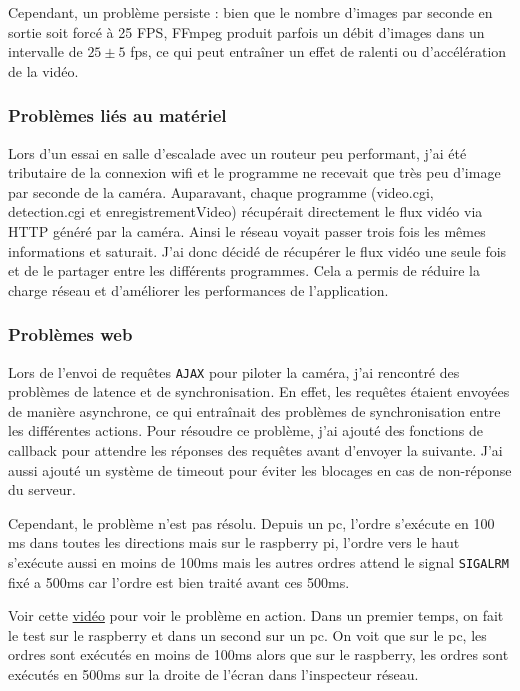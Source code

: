 \documentclass[a4paper, 11pt, french]{article}
\begin{document}
Cependant, un problème persiste : bien que le nombre d'images par seconde en sortie soit forcé à 25 FPS, FFmpeg produit parfois un débit d'images dans un intervalle de \(25\pm 5\) fps, ce qui peut entraîner un effet de ralenti ou d'accélération de la vidéo.

\subsubsection{Problèmes liés au matériel} Lors d'un essai en salle d'escalade avec un routeur peu performant, j'ai été tributaire de la connexion wifi et le programme ne recevait que très peu d'image par seconde de la caméra. Auparavant, chaque programme (video.cgi, detection.cgi et enregistrementVideo) récupérait directement le flux vidéo via HTTP généré par la caméra. Ainsi le réseau voyait passer trois fois les mêmes informations et saturait. J'ai donc décidé de récupérer le flux vidéo une seule fois et de le partager entre les différents programmes. Cela a permis de réduire la charge réseau et d'améliorer les performances de l'application.

\subsubsection{Problèmes web} Lors de l'envoi de requêtes \texttt{AJAX} pour piloter la caméra, j'ai rencontré des problèmes de latence et de synchronisation. En effet, les requêtes étaient envoyées de manière asynchrone, ce qui entraînait des problèmes de synchronisation entre les différentes actions. Pour résoudre ce problème, j'ai ajouté des fonctions de callback pour attendre les réponses des requêtes avant d'envoyer la suivante. J'ai aussi ajouté un système de timeout pour éviter les blocages en cas de non-réponse du serveur.

Cependant, le problème n'est pas résolu. Depuis un pc, l'ordre s’exécute en 100 ms dans toutes les directions mais sur le raspberry pi, l'ordre vers le haut s'exécute aussi en moins de 100ms mais les autres ordres attend le signal \texttt{SIGALRM} fixé a 500ms car l'ordre est bien traité avant ces 500ms. 

Voir cette \href{https://youtu.be/0Z2cE6WyGWY}{vidéo} pour voir le problème en action. Dans un premier temps, on fait le test sur le raspberry et dans un second sur un pc. On voit que sur le pc, les ordres sont exécutés en moins de 100ms alors que sur le raspberry, les ordres sont exécutés en 500ms sur la droite de l'écran dans l'inspecteur réseau.
\end{document}
